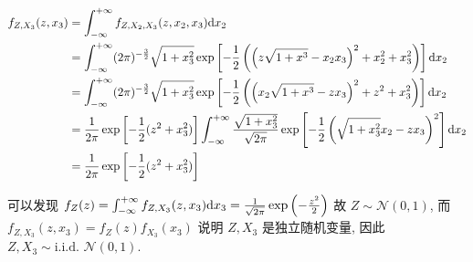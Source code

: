 \documentclass[8pt]{article}
\theoremstyle{compact}
\begin{document}
\subsection{}
\begin{equation}
	\begin{split}
		f_{Z, X_3}(z, x_3) &= \int_{-\infty}^{+\infty}f_{Z, X_2, X_3}(z, x_2, x_3)\text dx_2\\
		&= \int_{-\infty}^{+\infty} (2\pi)^{-\frac32}\sqrt{1+x_3^2}\exp\left[-\frac12\left(\left(z\sqrt{1+x^3}-x_2x_3\right)^2+x_2^2+x_3^2\right)\right]\text dx_2\\
		&= \int_{-\infty}^{+\infty} (2\pi)^{-\frac32}\sqrt{1+x_3^2}\exp\left[-\frac12\left(\left(x_2\sqrt{1+x^3}-zx_3\right)^2+z^2+x_3^2\right)\right]\text dx_2\\
		&= \frac{1}{2\pi}\exp\left[-\frac12(z^2 + x_3^2)\right]\int_{-\infty}^{+\infty}\frac{\sqrt{1 + x_3^2}}{\sqrt{2\pi}}\exp\left[-\frac12\left(\sqrt{1+x_3^2}x_2 - zx_3\right)^2\right]\text dx_2\\
		&= \frac{1}{2\pi}\exp\left[-\frac12(z^2 + x_3^2)\right]
	\end{split}
\end{equation}

可以发现 $f_Z(z) = \int_{-\infty}^{+\infty}f_{Z, X_3}(z, x_3)\text dx_3 = \frac{1}{\sqrt{2\pi}}\exp\left(-\frac{z^2}{2}\right)$ 故 $Z \sim \mathcal N(0, 1)$, 而 $f_{Z, X_3}(z, x_3) = f_Z(z)f_{X_3}(x_3)$ 说明 $Z, X_3$ 是独立随机变量, 因此 $Z, X_3 \sim \text{i.i.d. } \mathcal N(0, 1)$.
\end{document}
